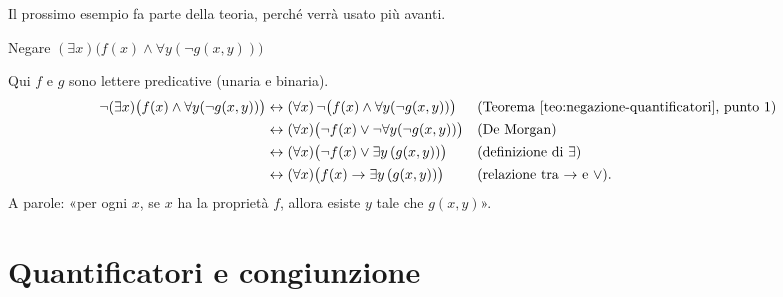 Il prossimo esempio fa parte della teoria, perché verrà usato più avanti.

\begin{esempio}{Negare $(\exists x)\big(f(x) \wedge \forall y(\neg g(x,y))\big)$}
    \begin{prerequisiti}
    \end{prerequisiti}
    Qui $f$ e $g$ sono lettere predicative (unaria e binaria).
    \[
    \begin{aligned}
        \neg(\exists x)\big(f(x) \wedge \forall y(\neg g(x,y))\big)
        &\leftrightarrow (\forall x)\,\neg\big(f(x) \wedge \forall y(\neg g(x,y))\big) && \text{(Teorema~\ref{teo:negazione-quantificatori}, punto 1)}\\
        &\leftrightarrow (\forall x)\big(\neg f(x) \vee \neg\forall y(\neg g(x,y))\big) && \text{(De Morgan)}\\
        &\leftrightarrow (\forall x)\big(\neg f(x) \vee \exists y\,(g(x,y))\big) && \text{(definizione di $\exists$)}\\
        &\leftrightarrow (\forall x)\big(f(x) \rightarrow \exists y\,(g(x,y))\big) && \text{(relazione tra $\rightarrow$ e $\vee$)}.
    \end{aligned}
    \]
    A parole: «per ogni $x$, se $x$ ha la proprietà $f$, allora esiste $y$ tale che $g(x,y)$».
\end{esempio}

\section{Quantificatori e congiunzione}\label{sec:quant-congiunzione}


